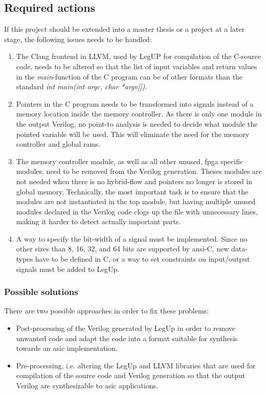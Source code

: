 \subsection{Required actions}
\label{subsec:reqact}
If this project should be extended into a master thesis or a project at a later stage, the following issues needs to be handled:
\begin{enumerate}
    \item \label{item:futworkprob}The Clang frontend in LLVM, used by LegUP for compilation of the C-source code, needs to be altered so that the list of input variables and return values in the \textit{main}-function of the C program can be of other formats than the standard \textit{int main(int argc, char *argv[])}.
    \item Pointers in the C program needs to be transformed into signals instead of a memory location inside the memory controller. As there is only one module in the output Verilog, no point-to analysis is needed to decide what module the pointed variable will be used. This will eliminate the need for the memory controller and global \gls{ram}s.
    \item The memory controller module, as well as all other unused, \gls{fpga} specific modules, need to be removed from the Verilog generation. Theses modules are not needed when there is no hybrid-flow and pointers no longer is stored in global memory. Technically, the most important task is to ensure that the modules are not instantiated in the top module, but having multiple unused modules declared in the Verilog code clogs up the file with unnecessary lines, making it harder to detect actually important parts.
    \item A way to specify the bit-width of a signal must be implemented. Since no other sizes than 8, 16, 32, and 64 bits are supported by \gls{ansi}-C, new data-types have to be defined in C, or a way to set constraints on input/output signals must be added to LegUp.
\end{enumerate}

\subsubsection{Possible solutions}

There are two possible approaches in order to fix these problems:
\begin{itemize}
\item Post-processing of the Verilog generated by LegUp in order to remove unwanted code and adapt the code into a format suitable for synthesis towards an \gls{asic} implementation.
\item Pre-processing, i.e. altering the LegUp and LLVM libraries that are used for compilation of the source code and Verilog generation so that the output Verilog are synthesizable to \gls{asic} applications.
\end{itemize}

